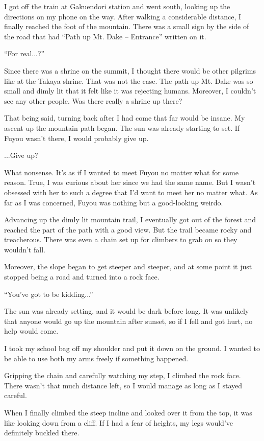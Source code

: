 I got off the train at Gakuendori station and went south, looking up the directions on my phone on the way. After walking a considerable distance, I finally reached the foot of the mountain. There was a small sign by the side of the road that had ``Path up Mt. Dake -- Entrance'' written on it.

``For real...?''

Since there was a shrine on the summit, I thought there would be other pilgrims like at the Takaya shrine. That was not the case. The path up Mt. Dake was so small and dimly lit that it felt like it was rejecting humans. Moreover, I couldn't see any other people. Was there really a shrine up there?

That being said, turning back after I had come that far would be insane. My ascent up the mountain path began. The sun was already starting to set. If Fuyou wasn't there, I would probably give up.

...Give up?

What nonsense. It's as if I wanted to meet Fuyou no matter what for some reason. True, I was curious about her since we had the same name. But I wasn't obsessed with her to such a degree that I'd want to meet her no matter what. As far as I was concerned, Fuyou was nothing but a good-looking weirdo.

Advancing up the dimly lit mountain trail, I eventually got out of the forest and reached the part of the path with a good view. But the trail became rocky and treacherous. There was even a chain set up for climbers to grab on so they wouldn't fall.

Moreover, the slope began to get steeper and steeper, and at some point it just stopped being a road and turned into a rock face.

``You've got to be kidding...''

The sun was already setting, and it would be dark before long. It was unlikely that anyone would go up the mountain after sunset, so if I fell and got hurt, no help would come.

I took my school bag off my shoulder and put it down on the ground. I wanted to be able to use both my arms freely if something happened.

Gripping the chain and carefully watching my step, I climbed the rock face. There wasn't that much distance left, so I would manage as long as I stayed careful.

When I finally climbed the steep incline and looked over it from the top, it was like looking down from a cliff. If I had a fear of heights, my legs would've definitely buckled there.

